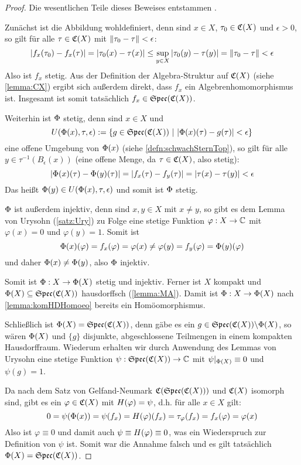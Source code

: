 \begin{proof}Die wesentlichen Teile dieses Beweises entstammen \cite[Bemerkung 2.1.33]{Baer2003}.

Zunächst ist die Abbildung wohldefiniert, denn sind $x \in X$, $\tau_0 \in \mathfrak{C}(X)$ und $\epsilon > 0$, so gilt für alle $\tau \in \mathfrak{C}(X)$ mit $\left\lVert\tau_0 - \tau\right\rVert < \epsilon$:
	\[\left|f_x(\tau_0) - f_x(\tau)\right| = \left|\tau_0(x) - \tau(x)\right| \leq \underset{y \in X}{\sup} \left|\tau_0(y) - \tau(y)\right| = \left\lVert\tau_0 - \tau\right\rVert < \epsilon \]
Also ist $f_x$ stetig. Aus der Definition der Algebra-Struktur auf $\mathfrak{C}(X)$ (siehe \cref{lemma:CX}) ergibt sich außerdem direkt, dass $f_x$ ein Algebrenhomomorphismus ist. Insgesamt ist somit tatsächlich $f_x \in \mathfrak{Spec}(\mathfrak{C}(X))$.

Weiterhin ist $\Phi$ stetig, denn sind $x \in X$ und 
	\[U(\Phi(x), \tau, \epsilon) := \{g \in \mathfrak{Spec}(\mathfrak{C}(X)) ~|~ |\Phi(x)(\tau) - g(\tau)| < \epsilon\}\]
eine offene Umgebung von $\Phi(x)$ (siehe \cref{defn:schwachSternTop}), so gilt für alle $y \in \tau^{-1}(B_\epsilon(x))$ (eine offene Menge, da $\tau \in \mathfrak{C}(X)$, also stetig):
	\[\left|\Phi(x)(\tau) - \Phi(y)(\tau)\right| = \left|f_x(\tau) - f_y(\tau)\right| = \left|\tau(x) - \tau(y)\right| < \epsilon \]
Das heißt $\Phi(y) \in U(\Phi(x), \tau, \epsilon)$ und somit ist $\Phi$ stetig.

$\Phi$ ist außerdem injektiv, denn sind $x, y \in X$ mit $x \neq y$, so gibt es dem Lemma von Urysohn (\ref{satz:Ury}) zu Folge eine stetige Funktion $\varphi: X \to \mathbb{C}$ mit $\varphi(x) = 0$ und $\varphi(y) = 1$. Somit ist 
	\[\Phi(x)(\varphi) = f_x(\varphi) = \varphi(x) \neq \varphi(y) = f_y(\varphi) = \Phi(y)(\varphi)\]
und daher $\Phi(x) \neq \Phi(y)$, also $\Phi$ injektiv.

Somit ist $\Phi: X \to \Phi(X)$ stetig und injektiv. Ferner ist $X$ kompakt und $\Phi(X) \subseteq \mathfrak{Spec}(\mathfrak{C}(X))$ hausdorffsch (\cref{lemma:MA}). Damit ist $\Phi: X \to \Phi(X)$ nach \cref{lemma:komHDHomoeo} bereits ein Homöomorphismus.

Schließlich ist $\Phi(X) = \mathfrak{Spec}(\mathfrak{C}(X))$, denn gäbe es ein $g \in \mathfrak{Spec}(\mathfrak{C}(X)) \backslash \Phi(X)$, so wären $\Phi(X)$ und $\{g\}$ disjunkte, abgeschlossene Teilmengen in einem kompakten Hausdorffraum. Wiederum erhalten wir durch Anwendung des Lemmas von Urysohn eine stetige Funktion $\psi: \mathfrak{Spec}(\mathfrak{C}(X)) \to \mathbb{C}$ mit $\psi|_{\Phi(X)} \equiv 0$ und $\psi(g) = 1$. 

Da nach dem Satz von Gelfand-Neumark $\mathfrak{C}(\mathfrak{Spec}(\mathfrak{C}(X)))$ und $\mathfrak{C}(X)$ isomorph sind, gibt es ein $\varphi \in \mathfrak{C}(X)$ mit $H(\varphi) = \psi$, d.h. für alle $x \in X$ gilt:
	\[0 = \psi(\Phi(x)) = \psi(f_x) = H(\varphi)(f_x) = \tau_\varphi(f_x) = f_x(\varphi) = \varphi(x)\]
Also ist $\varphi \equiv 0$ und damit auch $\psi \equiv H(\varphi) \equiv 0$, was ein Wiederspruch zur Definition von $\psi$ ist. Somit war die Annahme falsch und es gilt tatsächlich $\Phi(X) = \mathfrak{Spec}(\mathfrak{C}(X))$.
\end{proof}

